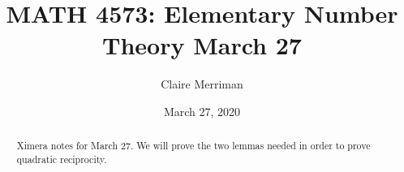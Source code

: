 \documentclass{xourse}
\title{MATH 4573: Elementary Number Theory March 27}
\author{Claire Merriman}
\date{March 27, 2020}
\begin{document}
  
\begin{abstract} %
Ximera notes for March 27. We will prove the two lemmas needed in order to prove quadratic reciprocity.
\end{abstract}  
\maketitle 
 
 
\end{document}

